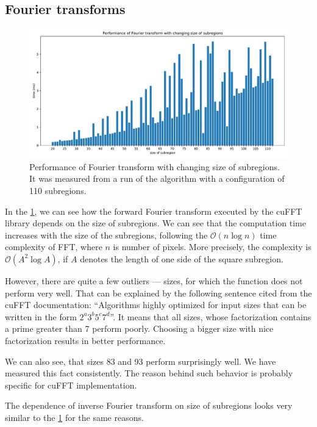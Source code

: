 \subsection{Fourier transforms}
\label{FFT-eval}
\begin{figure}
	\centering
	\includegraphics[width=\textwidth]{img/eval/Fourier-transform-size}
	\caption{Performance of Fourier transform with changing size of subregions. It was measured from a run of the algorithm with a configuration of 110 subregions.}
	\label{Fourier-transform-size}
\end{figure}

In the \cref{Fourier-transform-size}, we can see how the forward Fourier transform executed by the cuFFT library depends on the size of subregions. We can see that the computation time increases with the size of the subregions, following the $\mathcal{O}(n \log n)$ time complexity of FFT, where $n$ is number of pixels. More precisely, the complexity is $\mathcal{O}(A^2 \log A)$, if $A$ denotes the length of one side of the square subregion.

However, there are quite a few outliers --- sizes, for which the function does not perform very well. That can be explained by the following sentence cited from the cuFFT documentation: ``Algorithms highly optimized for input sizes that can be written in the form $2^a3^b5^c7^d$''. It means that all sizes, whose factorization contains a prime greater than 7 perform poorly. Choosing a bigger size with nice factorization results in better performance.

We can also see, that sizes 83 and 93 perform surprisingly well. We have measured this fact consistently. The reason behind such behavior is probably specific for cuFFT implementation.

The dependence of inverse Fourier transform on size of subregions looks very similar to the \cref{Fourier-transform-size} for the same reasons.

